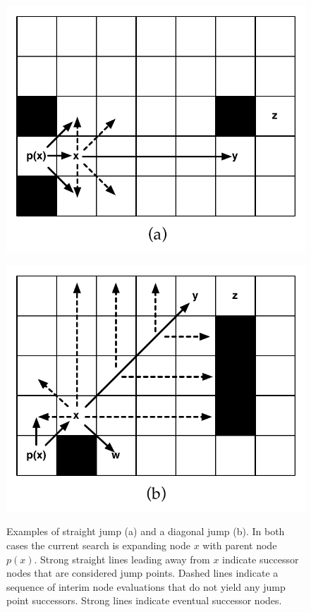 \begin{figure}[tb]
\centering
\begin{minipage}[tb]{0.49\columnwidth}
		   \includegraphics[width=\columnwidth, trim = 4mm 0mm 0mm 0mm]
			{chapter_jps/diagrams/jump_straight.pdf}
\label{fig::jps::jump_straight}
\end{minipage}
\begin{minipage}[tb]{0.49\columnwidth}
		   \includegraphics[width=\columnwidth, trim = 0mm 0mm 4mm 0mm]
			{chapter_jps/diagrams/jump_diagonal.pdf}
\label{fig::jps::jump_straight}
\end{minipage}
\label{fig::jps::jumppoints}
\vspace{-2em}
\caption{Examples of straight jump (a) and a diagonal jump (b).
In both cases the current search is expanding node $x$ with parent node $p(x)$.
Strong straight lines leading away from $x$ indicate successor nodes that are 
considered jump points.
Dashed lines indicate a sequence of interim node evaluations that do not yield any
jump point successors. Strong lines indicate eventual successor nodes.}
\label{fig::jps::jumppoints}
\end{figure}
